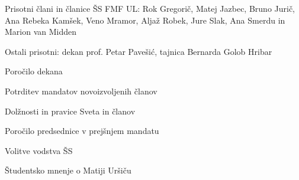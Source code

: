 \documentclass{seja}
\begin{document}
Prisotni člani in članice ŠS FMF UL:  Rok Gregorič, Matej Jazbec, Bruno Jurič,
Ana Rebeka Kamšek, Veno Mramor, Aljaž Robek, Jure Slak, Ana Smerdu in Marion van
Midden

Ostali prisotni:
dekan prof. Petar Pavešić, tajnica Bernarda Golob Hribar

\begin{red*}
\item Poročilo dekana
\item Potrditev mandatov novoizvoljenih članov
\item Dolžnosti in pravice Sveta in članov
\item Poročilo predsednice v prejšnjem mandatu
\item Volitve vodstva ŠS
\item Študentsko mnenje o Matiji Uršiču
\end{red*}
\end{document}
